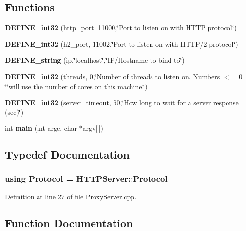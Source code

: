 \subsection*{Functions}
\begin{DoxyCompactItemize}
\item 
{\bf D\+E\+F\+I\+N\+E\+\_\+int32} (http\+\_\+port, 11000,\char`\"{}Port to listen on with H\+T\+TP protocol\char`\"{})
\item 
{\bf D\+E\+F\+I\+N\+E\+\_\+int32} (h2\+\_\+port, 11002,\char`\"{}Port to listen on with H\+T\+TP/2 protocol\char`\"{})
\item 
{\bf D\+E\+F\+I\+N\+E\+\_\+string} (ip,\char`\"{}localhost\char`\"{},\char`\"{}IP/Hostname to bind to\char`\"{})
\item 
{\bf D\+E\+F\+I\+N\+E\+\_\+int32} (threads, 0,\char`\"{}Number of threads to listen on. Numbers $<$= 0 \char`\"{}\char`\"{}will use the number of cores on this machine.\char`\"{})
\item 
{\bf D\+E\+F\+I\+N\+E\+\_\+int32} (server\+\_\+timeout, 60,\char`\"{}How long to wait for a server response (sec)\char`\"{})
\item 
int {\bf main} (int argc, char $\ast$argv[$\,$])
\end{DoxyCompactItemize}


\subsection{Typedef Documentation}
\subsubsection[{Protocol}]{\setlength{\rightskip}{0pt plus 5cm}using {\bf Protocol} =  {\bf H\+T\+T\+P\+Server\+::\+Protocol}}\label{ProxyServer_8cpp_a0c4543274a4aa8135167669efe8688c7}


Definition at line 27 of file Proxy\+Server.\+cpp.



\subsection{Function Documentation}
